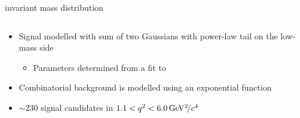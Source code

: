 \documentclass[aspectratio=1610]{beamer}
\begin{document}
\begin{frame}{\mkpimm invariant mass distribution}

\begin{columns}
\begin{column}{0.61\textwidth}
\begin{itemize}
  \item Signal modelled with sum of two Gaussians with power-law tail on the low-mass side
  \begin{itemize}
    \item[\ding{70}] Parameters determined from a fit to \BdToJPsiKst
  \end{itemize}
  \item Combinatorial background is modelled using an exponential function
  \item $\sim230$ signal candidates in $1.1<{q^2}<6.0{\mathrm{\,Ge\kern -0.1em V^2\!/}c^4}$
\end{itemize}


\end{column}
\end{columns}
\end{frame}
\end{document}
